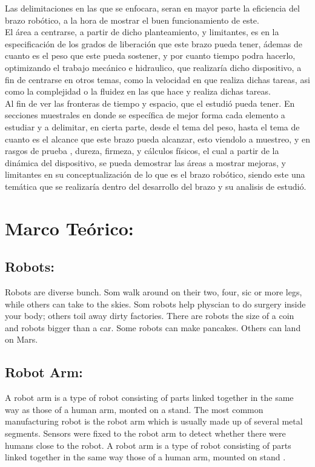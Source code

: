 \documentclass[14pt,a4paper]{article}
\begin{document}
Las delimitaciones en las que se enfocara, seran en mayor parte la eficiencia del brazo robótico, a la hora de mostrar el buen funcionamiento de este.\\
El área a centrarse, a partir de dicho planteamiento, y limitantes, es en la especificación de los grados de liberación que este brazo pueda tener, ádemas de cuanto es el peso que este pueda sostener, y por cuanto tiempo podra hacerlo, optimizando el trabajo mecánico e hidraulico, que realizaría dicho dispositivo, a fin de centrarse en otros temas, como la velocidad en que realiza dichas tareas, asi como la complejidad o la fluidez en las que hace y realiza dichas tareas.\\
Al fin de ver las fronteras de tiempo y espacio, que el estudió pueda tener. En secciones muestrales en donde se específica de mejor forma cada elemento a estudiar y a delimitar, en cierta parte, desde el tema del peso, hasta el tema de cuanto es el alcance que este brazo pueda alcanzar, esto viendolo a muestreo, y en rasgos de prueba , dureza, firmeza, y cálculos físicos, el cual a partir de la dinámica del dispositivo, se pueda demostrar las áreas a mostrar mejoras, y limitantes en su conceptualización de lo que es el brazo robótico, siendo este una temática que se realizaría dentro del desarrollo del brazo y su analisis de estudió.

\section{Marco Teórico:}

\subsection{Robots:}
Robots are diverse bunch. Som walk around on their two, four, sic or more legs, while others can take to the skies. Som robots help physcian to do surgery inside your body; others toil away dirty factories. There are robots the size of a coin and robots bigger than a car. Some robots can make pancakes. Others can land on Mars.

\subsection{Robot Arm:} 
A robot arm is a type of robot consisting of parts linked together in the same way as those of a human arm, monted on a stand.
The most common manufacturing robot is the robot arm which is usually made up of several metal segments.
Sensors were fixed to the robot arm to detect whether there were humans close to the robot.
A robot arm is a type of robot consisting of parts linked together in the same way those of a human arm, mounted on stand \citep{schilling1990fundamentals} .
\end{document}

